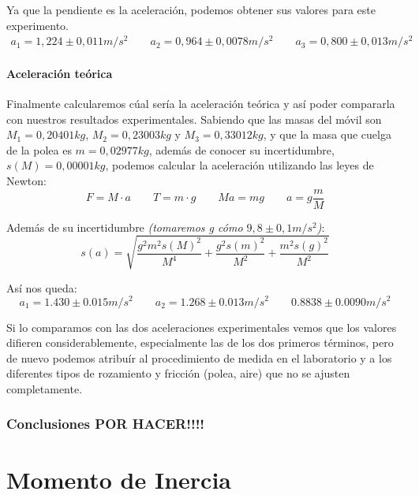 \documentclass[12pt, a4paper, titlepage]{article}
\begin{document}
  Ya que la pendiente es la aceleración, podemos obtener sus valores para este experimento.
  \begin{gather*}
    a_1 = 1,224 \pm 0,011 m/s^2 \qquad a_2 = 0,964 \pm 0,0078 m/s^2 \qquad a_3 = 0,800 \pm 0,013 m/s^2
  \end{gather*}

  \newpage
  \subsection{Aceleración teórica}

  Finalmente calcularemos cúal sería la aceleración teórica y así poder compararla con nuestros resultados experimentales. Sabiendo que las masas del móvil son $M_1 = 0,20401kg$, $M_2 = 0,23003kg$ y $M_3 = 0,33012kg$, y que la masa que cuelga de la polea es $m = 0,02977 kg$, además de conocer su incertidumbre, $s(M) = 0,00001 kg$, podemos calcular la aceleración utilizando las leyes de Newton:
  \begin{equation}
    F = M \cdot a \qquad T = m \cdot g \qquad Ma = mg \qquad a = g \frac{m}{M} \label{ec:accm}
  \end{equation}

  Además de su incertidumbre \textit{(tomaremos g cómo $9,8 \pm 0,1 m/s^2$)}:
  \begin{equation}
    s(a) = \sqrt{\frac{g^2 m^2 s(M)^2}{M^4} + \frac{g^2 s(m)^2}{M^2} + \frac{m^2 s(g)^2}{M^2}} \label{ec:saccm}
  \end{equation}

  Así nos queda:
  \begin{equation*}
    a_1 = 1.430 \pm 0.015 m/s^2 \qquad a_2 = 1.268 \pm 0.013 m/s^2 \qquad 0.8838 \pm 0.0090 m/s^2
  \end{equation*}

  Si lo comparamos con las dos aceleraciones experimentales vemos que los valores difieren considerablemente, especialmente las de los dos primeros términos, pero de nuevo podemos atribuír al procedimiento de medida en el laboratorio y a los diferentes tipos de rozamiento y fricción (polea, aire) que no se ajusten completamente.


  \newpage
  \section{Conclusiones POR HACER!!!!}


  \newpage
  \thispagestyle{plain}
  \mbox{}

  \newpage
  \part{Momento de Inercia}
\end{document}
